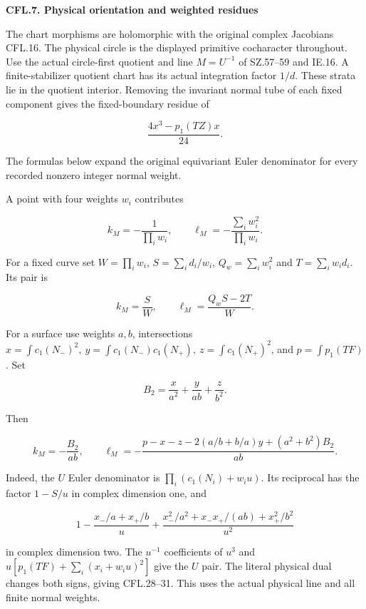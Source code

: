 \par

\medskip\noindent\textbf{CFL.7. Physical orientation and weighted residues}

\par\nobreak

The chart morphisms are holomorphic with the original
complex Jacobians CFL.16. The physical circle is the
displayed primitive cocharacter throughout. Use the
actual circle-first quotient and line \(M=U^{-1}\)
of SZ.57--59 and IE.16. A finite-stabilizer quotient
chart has its actual integration factor \(1/d\).
These strata lie in the quotient interior. Removing
the invariant normal tube of each fixed component gives
the fixed-boundary residue of

\[
                         \frac{4x^3-p_1(TZ)x}{24}.
 \tag{CFL.27}
\]

The formulas below expand the original equivariant
Euler denominator for every recorded nonzero integer
normal weight.

A point with four weights \(w_i\) contributes

\[
 k_M=-\frac1{\prod_iw_i},\qquad
 \ell_M=-\frac{\sum_iw_i^2}{\prod_iw_i}.
 \tag{CFL.28}
\]

For a fixed curve set \(W=\prod_iw_i\),
\(S=\sum_id_i/w_i\), \(Q_w=\sum_iw_i^2\) and
\(T=\sum_iw_id_i\). Its pair is

\[
                  k_M=\frac SW,\qquad
                  \ell_M=\frac{Q_wS-2T}{W}.
 \tag{CFL.29}
\]

For a surface use weights \(a,b\), intersections
\(x=\int c_1(N_-)^2,\ y=\int c_1(N_-)c_1(N_+),\
z=\int c_1(N_+)^2\), and \(p=\int p_1(TF)\).
Set

\[
                   B_2=\frac{x}{a^2}+\frac{y}{ab}+\frac{z}{b^2}.
 \tag{CFL.30}
\]

Then

\[
 k_M=-\frac{B_2}{ab},\qquad
 \ell_M=-\frac{p-x-z-2(a/b+b/a)y+(a^2+b^2)B_2}{ab}.
 \tag{CFL.31}
\]

Indeed, the \(U\) Euler denominator is
\(\prod_i(c_1(N_i)+w_i u)\). Its reciprocal has the
factor \(1-S/u\) in complex dimension one, and

\[
 1-\frac{x_-/a+x_+/b}{u}
 +\frac{x_-^2/a^2+x_-x_+/(ab)+x_+^2/b^2}{u^2}
\]

in complex dimension two. The \(u^{-1}\) coefficients
of \(u^3\) and
\(u[p_1(TF)+\sum_i(x_i+w_i u)^2]\) give the \(U\)
pair. The literal physical dual changes both signs,
giving CFL.28--31. This uses the actual physical line
and all finite normal weights.

